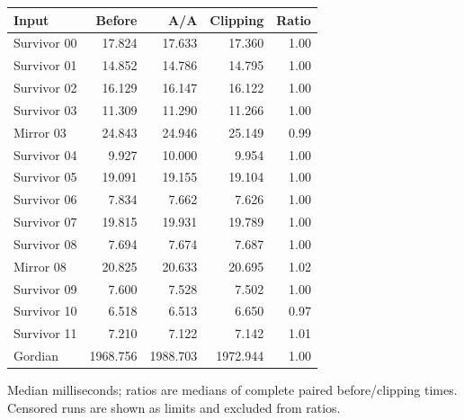 \begin{center}\small
\begin{tabular}{@{}lrrrr@{}}
\toprule
Input & Before & A/A & Clipping & Ratio \\
\midrule
Survivor 00 & 17.824 & 17.633 & 17.360 & 1.00 \\
Survivor 01 & 14.852 & 14.786 & 14.795 & 1.00 \\
Survivor 02 & 16.129 & 16.147 & 16.122 & 1.00 \\
Survivor 03 & 11.309 & 11.290 & 11.266 & 1.00 \\
Mirror 03 & 24.843 & 24.946 & 25.149 & 0.99 \\
Survivor 04 & 9.927 & 10.000 & 9.954 & 1.00 \\
Survivor 05 & 19.091 & 19.155 & 19.104 & 1.00 \\
Survivor 06 & 7.834 & 7.662 & 7.626 & 1.00 \\
Survivor 07 & 19.815 & 19.931 & 19.789 & 1.00 \\
Survivor 08 & 7.694 & 7.674 & 7.687 & 1.00 \\
Mirror 08 & 20.825 & 20.633 & 20.695 & 1.02 \\
Survivor 09 & 7.600 & 7.528 & 7.502 & 1.00 \\
Survivor 10 & 6.518 & 6.513 & 6.650 & 0.97 \\
Survivor 11 & 7.210 & 7.122 & 7.142 & 1.01 \\
Gordian & 1968.756 & 1988.703 & 1972.944 & 1.00 \\
\bottomrule
\end{tabular}
\end{center}
Median milliseconds; ratios are medians of complete paired before/clipping times. Censored runs are shown as limits and excluded from ratios.
